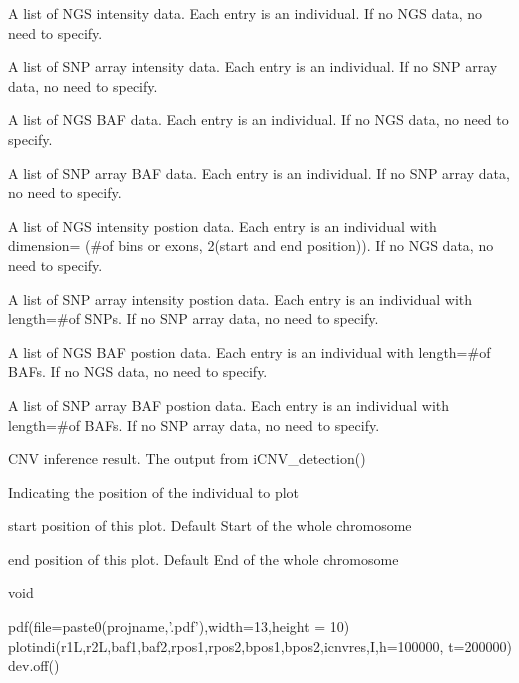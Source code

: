 \documentclass[a4paper]{book}
\begin{document}
\begin{Arguments}
\begin{ldescription}
\item[\code{ngs\_plr}] A list of NGS intensity data. Each entry is an individual. If no NGS data, no need to specify.

\item[\code{snp\_lrr}] A list of SNP array intensity data. Each entry is an individual. If no SNP array data, no need to specify.

\item[\code{ngs\_baf}] A list of NGS BAF data. Each entry is an individual. If no NGS data, no need to specify.

\item[\code{snp\_baf}] A list of SNP array BAF data. Each entry is an individual. If no SNP array data, no need to specify.

\item[\code{ngs\_plr.pos}] A list of NGS intensity postion data. Each entry is an individual with dimension= (\#of bins or exons, 2(start and end position)). If no NGS data, no need to specify.

\item[\code{snp\_lrr.pos}] A list of SNP array intensity postion data. Each entry is an individual with length=\#of SNPs. If no SNP array data, no need to specify.

\item[\code{ngs\_baf.pos}] A list of NGS BAF postion data. Each entry is an individual with length=\#of BAFs. If no NGS data, no need to specify.

\item[\code{snp\_baf.pos}] A list of SNP array BAF postion data. Each entry is an individual with length=\#of BAFs. If no SNP array data, no need to specify.

\item[\code{icnvres}] CNV inference result. The output from iCNV\_detection()

\item[\code{I}] Indicating the position of the individual to plot

\item[\code{h}] start position of this plot. Default Start of the whole chromosome

\item[\code{t}] end position of this plot. Default End of the whole chromosome
\end{ldescription}
\end{Arguments}
%
\begin{Value}
void
\end{Value}
%
\begin{Examples}
\begin{ExampleCode}
pdf(file=paste0(projname,'.pdf'),width=13,height = 10)
plotindi(r1L,r2L,baf1,baf2,rpos1,rpos2,bpos1,bpos2,icnvres,I,h=100000, t=200000)
dev.off()
\end{ExampleCode}
\end{Examples}
\printindex{}
\end{document}
